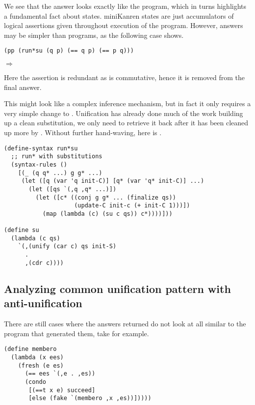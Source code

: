 We see that the answer looks exactly like the program, which in turns highlights a fundamental fact about states. miniKanren states are just accumulators of logical assertions given throughout execution of the program. However, answers may be simpler than programs, as the following case shows.
\begin{lstlisting}
(pp (run*su (q p) (== q p) (== p q)))
\end{lstlisting}
$\Rightarrow$ 

Here the assertion  is redundant as \code{==} is commutative, hence it is removed from the final answer.

This might look like a complex inference mechanism, but in fact it only requires a very simple change to . Unification has already done much of the work building up a clean substitution, we only need to retrieve it back after it has been cleaned up more by . Without further hand-waving, here is .
\begin{lstlisting}
(define-syntax run*su
  ;; run* with substitutions
  (syntax-rules ()
    [(_ (q q* ...) g g* ...)
     (let ([q (var 'q init-C)] [q* (var 'q* init-C)] ...)
       (let ([qs `(,q ,q* ...)])
         (let ([c* ((conj g g* ... (finalize qs))
                    (update-C init-c (+ init-C 1)))])
           (map (lambda (c) (su c qs)) c*))))]))

(define su
  (lambda (c qs)
    `(,(unify (car c) qs init-S)
      .
      ,(cdr c))))
\end{lstlisting}

\subsection{Analyzing common unification pattern with anti-unification}\label{au}
There are still cases where the answers returned do not look at all similar to the program that generated them, take  for example.
\begin{lstlisting}
(define membero
  (lambda (x ees)
    (fresh (e es)
      (== ees `(,e . ,es))
      (condo
       [(==t x e) succeed]
       [else (fake `(membero ,x ,es))]))))
\end{lstlisting}

